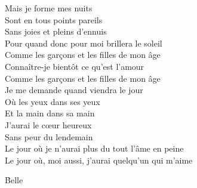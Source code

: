 \documentclass{novel}
\begin{document}
Mais je forme mes nuits \\
Sont en tous points pareils \\
Sans joies et pleins d'ennuis \\
Pour quand donc pour moi brillera le soleil \\

Comme les garçons et les filles de mon âge \\
Connaître-je bientôt ce qu'est l'amour \\
Comme les garçons et les filles de mon âge \\
Je me demande quand viendra le jour \\
Où les yeux dans ses yeux \\
Et la main dans sa main \\
J'aurai le cœur heureux \\
Sans peur du lendemain \\
Le jour où je n'aurai plus du tout l'âme en peine \\
Le jour où, moi aussi, j'aurai quelqu'un qui m'aime

\newpage
\small
\h*{Belle}
\end{document}

